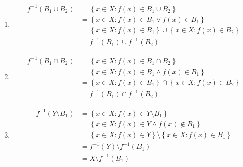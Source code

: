 \begin{description}
\begin{enumerate}
                \item \begin{equation*}\begin{aligned}
                                f^{-1} (B_1 \cup B_2)
                                &= \left\{x \in X : f(x) \in B_1 \cup
                                B_2\right\} \\
                                &= \left\{x \in X : f(x) \in B_1 \lor
                                f(x) \in B_1\right\} \\
                                &= \left\{x \in X : f(x) \in B_1\right\} \cup
                                \left\{x \in X : f(x) \in B_2\right\} \\
                                &= f^{-1} (B_1) \cup f^{-1} (B_2)
                \end{aligned}\end{equation*}

                \item \begin{equation*}\begin{aligned}
                                f^{-1} (B_1 \cap B_2)
                                &= \left\{x \in X : f(x) \in B_1 \cap
                                B_2\right\} \\
                                &= \left\{x \in X : f(x) \in B_1 \land
                                f(x) \in B_1\right\} \\
                                &= \left\{x \in X : f(x) \in B_1\right\} \cap
                                \left\{x \in X : f(x) \in B_2\right\} \\
                                &= f^{-1} (B_1) \cap f^{-1} (B_2)
                \end{aligned}\end{equation*}

                \item \begin{equation*}\begin{aligned}
                                f^{-1} (Y \setminus B_1)
                                &= \left\{x \in X : f(x) \in Y \setminus
                                B_1\right\} \\
                                &= \left\{x \in X : f(x) \in Y \land
                                f(x) \not\in B_1\right\} \\
                                &= \left\{x \in X : f(x) \in Y\right\}
                                \setminus
                                \left\{x \in X : f(x) \in B_1\right\} \\
                                &= f^{-1} (Y) \setminus f^{-1} (B_1) \\
                                &= X \setminus f^{-1} (B_1)
                \end{aligned}\end{equation*}

        \end{enumerate}
\end{description}
